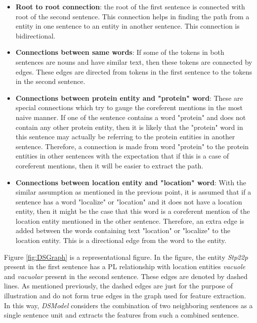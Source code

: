 \begin{itemize}

\item \textbf{Root to root connection}: the root of the first sentence is connected with root of the second sentence. This connection helps in finding the path from a entity in one sentence to an entity in another sentence. This connection is bidirectional.

\item \textbf{Connections between same words}: If some of the tokens in both sentences are nouns and have similar text, then these tokens are connected by edges. These edges are directed from tokens in the first sentence to the tokens in the second sentence.

\item \textbf{Connections between protein entity and "protein" word}: These are special connections which try to gauge the coreferent mentions in the most naive manner. If one of the sentence contains a word "protein" and does not contain any other protein entity, then it is likely that the "protein" word in this sentence may actually be referring to the protein entities in another sentence. Therefore, a connection is made from word "protein" to the protein entities in other sentences with the expectation that if this is a case of coreferent mentions, then it will be easier to extract the path. 

\item \textbf{Connections between location entity and "location" word}: With the similar assumption as mentioned in the previous point, it is assumed that if a sentence has a word "localize" or "location" and it does not have a location entity, then it might be the case that this word is a coreferent mention of the location entity mentioned in the other sentence. Therefore, an extra edge is added between the words containing text "location" or "localize" to the location entity. This is a directional edge from the word to the entity.

\end{itemize}

Figure \ref{fig:DSGraph} is a representational figure. In the figure, the entity \textit{Stp22p} present in the first sentence has a PL relationship with location entities \textit{vacuole} and \textit{vacuolar} present in the second sentence. These edges are denoted by dashed lines. As mentioned previously, the dashed edges are just for the purpose of illustration and do not form true edges in the graph used for feature extraction. In this way, \textit{DSModel} considers the combination of two neighboring sentences as a single sentence unit and extracts the features from such a combined sentence.

